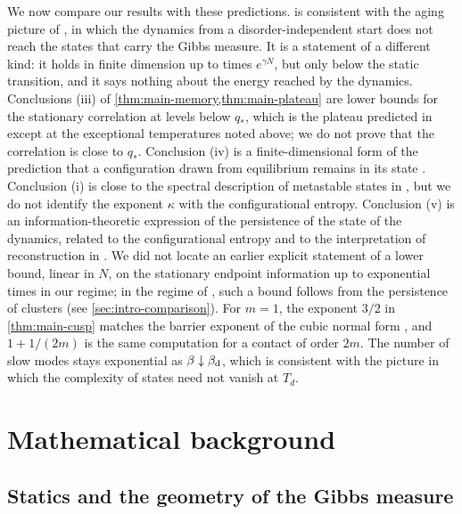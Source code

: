 We now compare our results with these predictions.  is consistent with the aging picture of \cite{CugliandoloKurchan1993}, in which the dynamics from a disorder-independent start does not reach the states that carry the Gibbs measure. It is a statement of a different kind: it holds in finite dimension up to times $e^{\gamma N}$, but only below the static transition, and it says nothing about the energy reached by the dynamics. Conclusions (iii) of \cref{thm:main-memory,thm:main-plateau} are lower bounds for the stationary correlation at levels below $q_*$, which is the plateau predicted in \cite{CrisantiHornerSommers1993,BarratBurioniMezard1996,FolenaFranzRicciTersenghi2020} except at the exceptional temperatures noted above; we do not prove that the correlation is close to $q_*$. Conclusion (iv) is a finite-dimensional form of the prediction that a configuration drawn from equilibrium remains in its state \cite{BarratBurioniMezard1996,FranzParisi1995}. Conclusion (i) is close to the spectral description of metastable states in \cite{BiroliKurchan2001,TanaseNicolaKurchan2004}, but we do not identify the exponent $\kappa$ with the configurational entropy. Conclusion (v) is an information-theoretic expression of the persistence of the state of the dynamics, related to the configurational entropy \cite{Monasson1995} and to the interpretation of reconstruction in \cite{MezardMontanari2006}. We did not locate an earlier explicit statement of a lower bound, linear in $N$, on the stationary endpoint information up to exponential times in our regime; in the regime of \cite{ElAlaouiMontanariSellke2025}, such a bound follows from the persistence of clusters (see \cref{sec:intro-comparison}). For $m=1$, the exponent $3/2$ in \cref{thm:main-cusp} matches the barrier exponent of the cubic normal form \cite{Franz2005}, and $1+1/(2m)$ is the same computation for a contact of order $2m$. The number of slow modes stays exponential as $\beta\downarrow\beta_{\mathrm d}$, which is consistent with the picture in which the complexity of states need not vanish at $T_d$.

\section{Mathematical background}\label{sec:intro-math}

\subsection{Statics and the geometry of the Gibbs measure}\label{sec:intro-statics}

